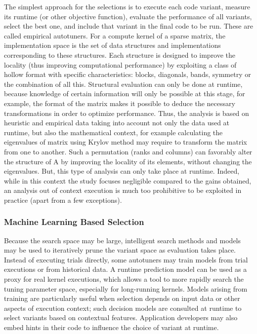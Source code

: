 The simplest approach for the selections is to execute each code variant, measure its runtime (or other objective function), evaluate the performance of all variants, select the best one, and include that variant in the final code to be run. These are called empirical autotuners. For a compute kernel of a sparse matrix, the implementation space is the set of data structures and implementations corresponding to these structures. Each structure is designed to improve the locality (thus improving computational performance) by exploiting a class of hollow format with specific characteristics: blocks, diagonals, bands, symmetry or the combination of all this. Structural evaluation can only be done at runtime, because knowledge of certain information will only be possible at this stage, for example, the format of the matrix makes it possible to deduce the necessary transformations in order to optimize performance. Thus, the analysis is based on heuristic and empirical data taking into account not only the data used at runtime, but also the mathematical context, for example calculating the eigenvalues of matrix using Krylov method may require to transform the matrix from one to another. Such a permutation (ranks and columns) can favorably alter the structure of A by improving the locality of its elements, without changing the eigenvalues. But, this type of analysis can only take place at runtime. Indeed, while in this context the study focuses negligible compared to the gains obtained, an analysis out of context execution is much too prohibitive to be exploited in practice (apart from a few exceptions).


\subsubsection{Machine Learning Based Selection}

Because the search space may be large, intelligent search methods and models may be used to iteratively prune the variant space as evaluation takes place. Instead of executing trials directly, some autotuners may train models from trial executions or from historical data. A runtime prediction model can be used as a proxy for real kernel executions, which allows a tool to more rapidly search the tuning parameter space, especially for long-running kernels. Models arising from training are particularly useful when selection depends on input data or other aspects of execution context; such decision models are consulted at runtime to select variants based on contextual features. Application developers may also embed hints in their code to influence the choice of variant at runtime.

